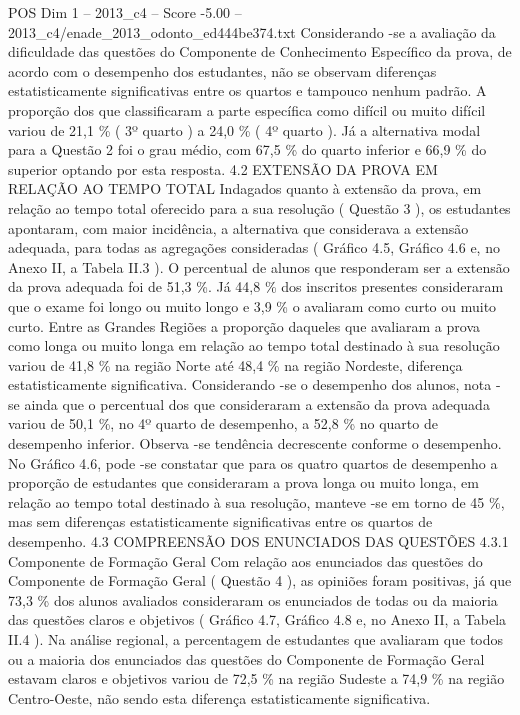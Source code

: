 \begin{textsample}{POS Dim 1 – 2013\_c4 – Score -5.00 – 2013\_c4/enade\_2013\_odonto\_ed444be374.txt}
Considerando -se a avaliação da dificuldade das questões do Componente de Conhecimento Específico da prova, de acordo com o desempenho dos estudantes, não se observam diferenças estatisticamente significativas entre os quartos e tampouco nenhum padrão.
A proporção dos que classificaram a parte específica como difícil ou muito difícil variou de 21,1 \% ( 3º quarto ) a 24,0 \% ( 4º quarto ).
Já a alternativa modal para a Questão 2 foi o grau médio, com 67,5 \% do quarto inferior e 66,9 \% do superior optando por esta resposta. 4.2 EXTENSÃO DA PROVA EM RELAÇÃO AO TEMPO TOTAL Indagados quanto à extensão da prova, em relação ao tempo total oferecido para a sua resolução ( Questão 3 ), os estudantes apontaram, com maior incidência, a alternativa que considerava a extensão adequada, para todas as agregações consideradas ( Gráfico 4.5, Gráfico 4.6 e, no Anexo II, a Tabela II.3 ).
O percentual de alunos que responderam ser a extensão da prova adequada foi de 51,3 \%.
Já 44,8 \% dos inscritos presentes consideraram que o exame foi longo ou muito longo e 3,9 \% o avaliaram como curto ou muito curto.
Entre as Grandes Regiões a proporção daqueles que avaliaram a prova como longa ou muito longa em relação ao tempo total destinado à sua resolução variou de 41,8 \% na região Norte até 48,4 \% na região Nordeste, diferença estatisticamente significativa.
Considerando -se o desempenho dos alunos, nota -se ainda que o percentual dos que consideraram a extensão da prova adequada variou de 50,1 \%, no 4º quarto de desempenho, a 52,8 \% no quarto de desempenho inferior.
Observa -se tendência decrescente conforme o desempenho.
No Gráfico 4.6, pode -se constatar que para os quatro quartos de desempenho a proporção de estudantes que consideraram a prova longa ou muito longa, em relação ao tempo total destinado à sua resolução, manteve -se em torno de 45 \%, mas sem diferenças estatisticamente significativas entre os quartos de desempenho. 4.3 COMPREENSÃO DOS ENUNCIADOS DAS QUESTÕES 4.3.1 Componente de Formação Geral Com relação aos enunciados das questões do Componente de Formação Geral ( Questão 4 ), as opiniões foram positivas, já que 73,3 \% dos alunos avaliados consideraram os enunciados de todas ou da maioria das questões claros e objetivos ( Gráfico 4.7, Gráfico 4.8 e, no Anexo II, a Tabela II.4 ).
Na análise regional, a percentagem de estudantes que avaliaram que todos ou a maioria dos enunciados das questões do Componente de Formação Geral estavam claros e objetivos variou de 72,5 \% na região Sudeste a 74,9 \% na região Centro-Oeste, não sendo esta diferença estatisticamente significativa.

\end{textsample}
